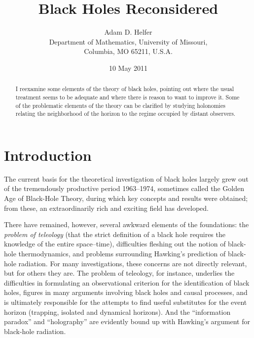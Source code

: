 \documentclass[12pt]{article}
\begin{document}
\title{Black Holes Reconsidered}

\author{Adam D. Helfer\\
  Department of Mathematics, University of Missouri, \\
  Columbia, MO 65211, U.S.A.\\
}

\date{10 May 2011}

\maketitle

\begin{abstract}
I reexamine some elements of the theory of black holes, pointing out where the usual treatment seems to be adequate and where there is reason to want to improve it.  Some of the problematic elements of the theory can be clarified by studying holonomies relating the neighborhood of the horizon to the regime occupied by distant observers.
\end{abstract}

\newpage

\section*{Introduction}

The current basis for the theoretical investigation of black holes largely grew out of the tremendously productive period 1963--1974, sometimes called the Golden Age of Black-Hole Theory, during which key concepts and results were obtained; from these, an extraordinarily rich and exciting
field has developed.

There have remained, however, several awkward elements of the foundations:  the {\em problem of teleology} (that the strict definition of a  black hole requires the knowledge of the entire
 space--time), difficulties fleshing out the notion of black-hole thermodynamics, and problems surrounding Hawking's prediction of black-hole radiation.  For many investigations, these concerns are not directly relevant, but for others they are.  
The problem of teleology, for instance, underlies the difficulties in formulating an observational criterion for the identification of black holes, figures in many arguments involving black holes and causal processes, and is ultimately responsible for the
attempts to find useful substitutes for the event horizon (trapping, isolated and dynamical horizons).
And the ``information paradox'' and ``holography'' are evidently bound up with Hawking's argument for black-hole radiation. 
\end{document}
